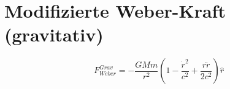 \section{Modifizierte Weber-Kraft (gravitativ)}
\[ F_{Weber}^{Grav} = -\frac{GMm}{r^2}\left(1 - \frac{\dot{r}^2}{c^2} + \frac{r\ddot{r}}{2c^2}\right)\hat{r} \]